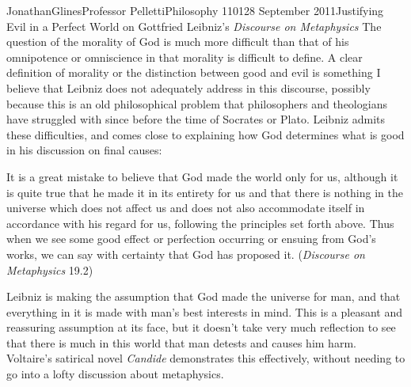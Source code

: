\documentclass[12pt,letterpaper]{article}
\begin{document}
\begin{mla}{Jonathan}{Glines}{Professor Pelletti}{Philosophy 1101}{28 September 2011}{Justifying Evil in a Perfect World on Gottfried Leibniz's \textit{Discourse on Metaphysics}}
The question of the morality of God is much more difficult than that of his omnipotence or omniscience in that morality is difficult to define. A clear definition of morality or the distinction between good and evil is something I believe that Leibniz does not adequately address in this discourse, possibly because this is an old philosophical problem that philosophers and theologians have struggled with since before the time of Socrates or Plato. Leibniz admits these difficulties, and comes close to explaining how God determines what is good in his discussion on final causes:
\begin{mlaquote}
It is a great mistake to believe that God made the world only for us, although it is quite true that he made it in its entirety for us and that there is nothing in the universe which does not affect us and does not also accommodate itself in accordance with his regard for us, following the principles set forth above. Thus when we see some good effect or perfection occurring or ensuing from God's works, we can say with certainty that God has proposed it. (\textit{Discourse on Metaphysics} 19.2)
\end{mlaquote}
Leibniz is making the assumption that God made the universe for man, and that everything in it is made with man's best interests in mind. This is a pleasant and reassuring assumption at its face, but it doesn't take very much reflection to see that there is much in this world that man detests and causes him harm. Voltaire's satirical novel \textit{Candide} demonstrates this effectively, without needing to go into a lofty discussion about metaphysics.


\end{mla}
\end{document}

